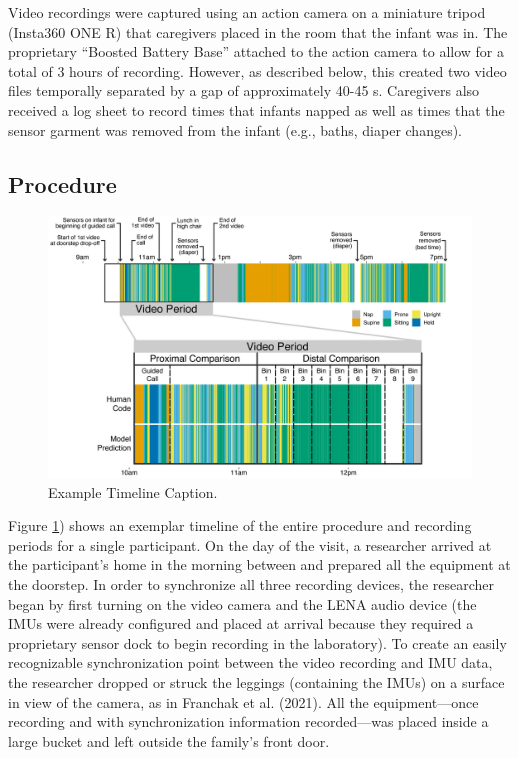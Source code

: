 \documentclass[
  man]{apa6}
\begin{document}
Video recordings were captured using an action camera on a miniature tripod (Insta360 ONE R) that caregivers placed in the room that the infant was in. The proprietary ``Boosted Battery Base'' attached to the action camera to allow for a total of 3 hours of recording. However, as described below, this created two video files temporally separated by a gap of approximately 40-45 s. Caregivers also received a log sheet to record times that infants napped as well as times that the sensor garment was removed from the infant (e.g., baths, diaper changes).

\hypertarget{procedure}{%
\subsection{Procedure}\label{procedure}}

\begin{figure}

{\centering \includegraphics[width=0.99\linewidth]{figures/timeline} 

}

\caption{Example Timeline Caption.}\label{fig:exemplar-timeline}
\end{figure}

Figure \ref{fig:exemplar-timeline}) shows an exemplar timeline of the entire procedure and recording periods for a single participant. On the day of the visit, a researcher arrived at the participant's home in the morning between and prepared all the equipment at the doorstep. In order to synchronize all three recording devices, the researcher began by first turning on the video camera and the LENA audio device (the IMUs were already configured and placed at arrival because they required a proprietary sensor dock to begin recording in the laboratory). To create an easily recognizable synchronization point between the video recording and IMU data, the researcher dropped or struck the leggings (containing the IMUs) on a surface in view of the camera, as in Franchak et al. (2021). All the equipment---once recording and with synchronization information recorded---was placed inside a large bucket and left outside the family's front door.
\end{document}
